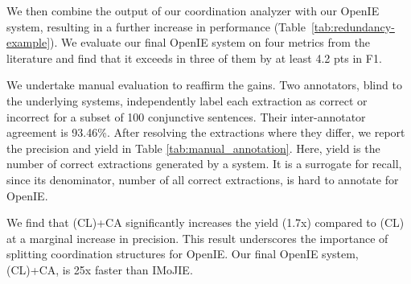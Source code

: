     We then combine the output of our coordination analyzer with our OpenIE system, resulting in a further increase in performance (Table~\ref{tab:redundancy-example}). We evaluate our final OpenIE system on four metrics from the literature and find that it exceeds in three of them by at least 4.2 pts in F1.
    
    We undertake manual evaluation to reaffirm the gains. Two annotators, blind to the underlying systems, independently label each extraction as correct or incorrect for a subset of 100 conjunctive sentences. Their inter-annotator agreement is 93.46\%. After resolving the extractions where they differ, we report the precision and yield in Table \ref{tab:manual_annotation}. Here, yield is the number of correct extractions generated by a system. It is a surrogate for recall, since its denominator, number of all correct extractions, is hard to annotate for OpenIE.  

    We find that \mlilshortname(CL)+CA significantly increases the yield (1.7x) compared to \mlilshortname(CL) at a marginal increase in precision. This result underscores the importance of splitting coordination structures for OpenIE. Our final OpenIE system, \mlilshortname(CL)+CA, is 25x faster than IMoJIE.

    \begin{table}[h]
        \caption{Manual comparison of Precision and Yield on 100 random conjunctive sentences from CaRB Gold.}
        \label{tab:manual_annotation}
    \end{table}




